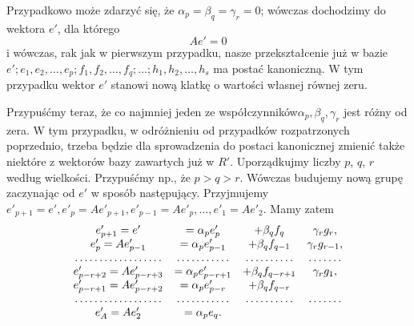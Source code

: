 \documentclass{article}
\begin{document}
  \par  Przypadkowo może zdarzyć się, że $\alpha_p=\beta_q=\gamma_r=0$; wówczas dochodzimy do wektora $e'$,
dla którego
$$Ae'=0$$
i wówczas, rak jak w pierwszym przypadku, nasze przekształcenie już w bazie \begin{math}e'; e_1, e_2, \ldots, e_p; f_1, f_2, \ldots,f_q; \ldots; h_1, h_2, \ldots, h_s \end{math} ma postać kanoniczną. W tym przypadku wektor $e'$
stanowi nową klatkę o wartości własnej równej zeru.
   \par Przypuśćmy teraz, że co najmniej jeden ze współczynników\begin{math} \alpha_p, \beta_q, \gamma_r \end{math} jest różny od zera.
W tym przypadku, w odróżnieniu od przypadków rozpatrzonych poprzednio, trzeba będzie
dla sprowadzenia do postaci kanonicznej zmienić także niektóre z wektorów bazy zawartych
już w $R'$. Uporządkujmy liczby $p$, $q$, $r$ według wielkości. Przypuśćmy np., że $p>q>r$.
Wówczas budujemy nową grupę zaczynając od $e'$ w sposób następujący. Przyjmujemy
\begin{math}e'_{p+1} = e', e'_p = Ae'_{p+1}, e'_{p-1}=Ae'_p, \ldots, e'_1=Ae'_2\end{math}. Mamy zatem
	\begin{displaymath}
		\begin{array}{c c c c}
		e'_{p+1}=e' & =\alpha_pe'_p & +\beta_qf_q & \gamma_rg_r, \\
		e'_{p}=Ae'_{p-1} & =\alpha_pe'_{p-1} & +\beta_qf_{q-1} & \gamma_rg_{r-1}, \\
		\dotfill & \dotfill & \dotfill & \dotfill \\
		e'_{p-r+2}=Ae'_{p-r+3} & =\alpha_pe'_{p-r+1} & +\beta_qf_{q-r+1} & \gamma_rg_1, \\
		e'_{p-r+1}=Ae'_{p-r+2} & =\alpha_pe'_{p-r} & +\beta_qf_{q-r} &\\
		\dotfill & \dotfill & \dotfill & \dotfill \\
		e'_A=Ae'_2 & =\alpha_pe_q. & &
		\end{array}
	\end{displaymath}
\end{document}
